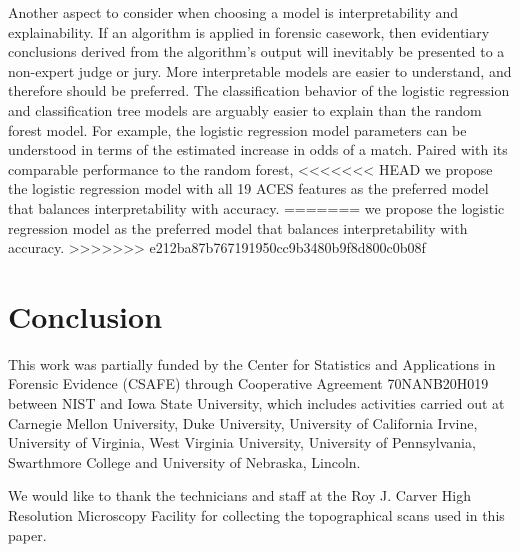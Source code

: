 \documentclass[reprint]{JASA}
\begin{document}
Another aspect to consider when choosing a model is interpretability and
explainability. If an algorithm is applied in forensic casework, then
evidentiary conclusions derived from the algorithm's output will
inevitably be presented to a non-expert judge or jury. More
interpretable models are easier to understand, and therefore should be
preferred. The classification behavior of the logistic regression and
classification tree models are arguably easier to explain than the
random forest model. For example, the logistic regression model
parameters can be understood in terms of the estimated increase in odds
of a match. Paired with its comparable performance to the random forest,
<<<<<<< HEAD
we propose the logistic regression model with all 19 ACES features as
the preferred model that balances interpretability with accuracy.
=======
we propose the logistic regression model as the preferred model that
balances interpretability with accuracy.
>>>>>>> e212ba87b767191950cc9b3480b9f8d800c0b08f

\hypertarget{conclusion}{%
\section{Conclusion}\label{conclusion}}

\begin{acknowledgments}
This work was partially funded by the Center for Statistics and
Applications in Forensic Evidence (CSAFE) through Cooperative Agreement
70NANB20H019 between NIST and Iowa State University, which includes
activities carried out at Carnegie Mellon University, Duke University,
University of California Irvine, University of Virginia, West Virginia
University, University of Pennsylvania, Swarthmore College and
University of Nebraska, Lincoln.

We would like to thank the technicians and staff at the Roy J. Carver
High Resolution Microscopy Facility for collecting the topographical
scans used in this paper.

\end{acknowledgments}
\end{document}
